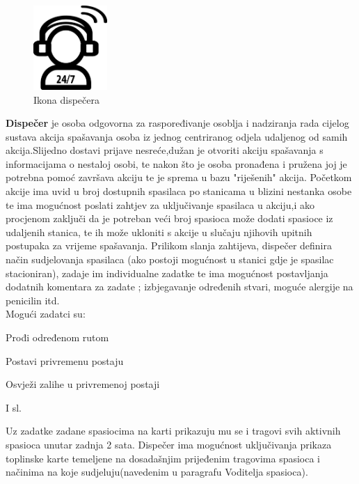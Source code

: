 {		
			\begin{figure}
				\centering
				\includegraphics[width=0.25\textwidth]{./slike/Dispatch.png}
				\caption{Ikona dispečera}
			\end{figure}
			\textbf{Dispečer} je osoba odgovorna za raspoređivanje osoblja i nadziranja rada cijelog sustava akcija spašavanja osoba iz jednog centriranog odjela udaljenog od samih akcija.Slijedno dostavi prijave nesreće,dužan je otvoriti akciju spašavanja s informacijama o nestaloj osobi, te nakon što je osoba pronađena i pružena joj je potrebna pomoć završava akciju te je sprema u bazu "riješenih" akcija. Početkom akcije ima uvid u broj dostupnih spasilaca po stanicama u blizini nestanka osobe te ima mogućnost poslati zahtjev za uključivanje spasilaca u akciju,i ako procjenom zaključi da je potreban veći broj spasioca može dodati spasioce iz udaljenih stanica, te ih može ukloniti s akcije u slučaju njihovih upitnih postupaka za vrijeme spašavanja. Prilikom slanja zahtijeva, dispečer definira način sudjelovanja spasilaca (ako postoji mogućnost u stanici gdje je spasilac stacioniran), zadaje im individualne zadatke te ima mogućnost postavljanja dodatnih komentara za zadate ; izbjegavanje određenih stvari, moguće alergije na penicilin itd. \\ Mogući zadatci su:
			
			\begin{packed_item}
				\item {Prođi određenom rutom} 
				\item {Postavi privremenu postaju}
				\item {Osvježi zalihe u privremenoj postaji}
				\item {I sl.}
			\end{packed_item}
			
			Uz zadatke zadane spasiocima na karti prikazuju mu se i tragovi svih aktivnih spasioca unutar zadnja 2 sata. Dispečer ima mogućnost uključivanja prikaza toplinske karte temeljene na dosadašnjim prijeđenim tragovima spasioca i načinima na koje sudjeluju(navedenim u paragrafu Voditelja spasioca).\\
		
}
